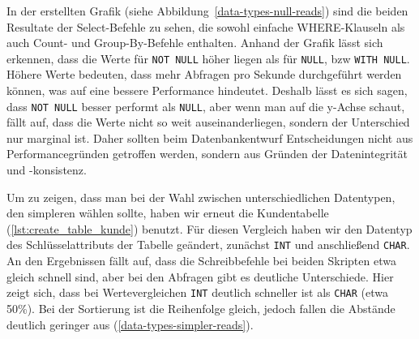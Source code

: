In der erstellten Grafik (siehe Abbildung~\ref{data-types-null-reads}) sind die beiden Resultate der Select-Befehle zu sehen, die sowohl einfache WHERE-Klauseln als auch Count- und Group-By-Befehle enthalten.
Anhand der Grafik lässt sich erkennen, dass die Werte für \texttt{NOT NULL} höher liegen als für \texttt{NULL}, bzw \texttt{WITH NULL}.
Höhere Werte bedeuten, dass mehr Abfragen pro Sekunde durchgeführt werden können, was auf eine bessere Performance hindeutet.
Deshalb lässt es sich sagen, dass \texttt{NOT NULL} besser performt als \texttt{NULL}, aber wenn man auf die y-Achse schaut, fällt auf, dass die Werte nicht so weit auseinanderliegen, sondern der Unterschied nur marginal ist.
Daher sollten beim Datenbankentwurf Entscheidungen nicht aus Performancegründen getroffen werden, sondern aus Gründen der Datenintegrität und -konsistenz.

Um zu zeigen, dass man bei der Wahl zwischen unterschiedlichen Datentypen, den simpleren wählen sollte, haben wir erneut die Kundentabelle (\ref{lst:create_table_kunde}) benutzt.
Für diesen Vergleich haben wir den Datentyp des Schlüsselattributs der Tabelle geändert, zunächst \texttt{INT} und anschließend \texttt{CHAR}.
An den Ergebnissen fällt auf, dass die Schreibbefehle bei beiden Skripten etwa gleich schnell sind, aber bei den Abfragen gibt es deutliche Unterschiede.
Hier zeigt sich, dass bei Wertevergleichen \texttt{INT} deutlich schneller ist als \texttt{CHAR} (etwa 50\%).
Bei der Sortierung ist die Reihenfolge gleich, jedoch fallen die Abstände deutlich geringer aus (\ref{data-types-simpler-reads}).

